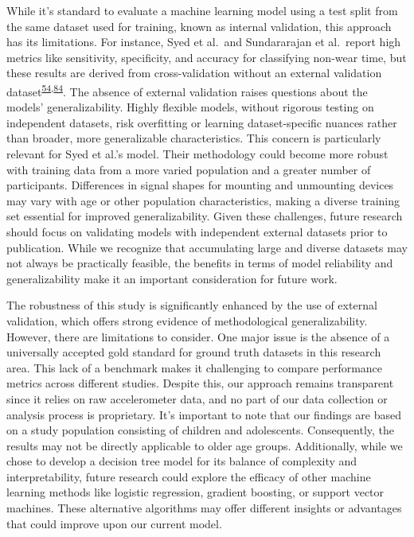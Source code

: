 \documentclass[
  9pt,
]{scrbook}
\begin{document}
While it's standard to evaluate a machine learning model using a test
split from the same dataset used for training, known as internal
validation, this approach has its limitations. For instance, Syed et
al.~and Sundararajan et al.~report high metrics like sensitivity,
specificity, and accuracy for classifying non-wear time, but these
results are derived from cross-validation without an external validation
dataset\textsuperscript{\protect\hyperlink{ref-sundararajan_sleep_2021}{54},\protect\hyperlink{ref-syed_evaluating_2020}{84}}.
The absence of external validation raises questions about the models'
generalizability. Highly flexible models, without rigorous testing on
independent datasets, risk overfitting or learning dataset-specific
nuances rather than broader, more generalizable characteristics. This
concern is particularly relevant for Syed et al.'s model. Their
methodology could become more robust with training data from a more
varied population and a greater number of participants. Differences in
signal shapes for mounting and unmounting devices may vary with age or
other population characteristics, making a diverse training set
essential for improved generalizability. Given these challenges, future
research should focus on validating models with independent external
datasets prior to publication. While we recognize that accumulating
large and diverse datasets may not always be practically feasible, the
benefits in terms of model reliability and generalizability make it an
important consideration for future work.

The robustness of this study is significantly enhanced by the use of
external validation, which offers strong evidence of methodological
generalizability. However, there are limitations to consider. One major
issue is the absence of a universally accepted gold standard for ground
truth datasets in this research area. This lack of a benchmark makes it
challenging to compare performance metrics across different studies.
Despite this, our approach remains transparent since it relies on raw
accelerometer data, and no part of our data collection or analysis
process is proprietary. It's important to note that our findings are
based on a study population consisting of children and adolescents.
Consequently, the results may not be directly applicable to older age
groups. Additionally, while we chose to develop a decision tree model
for its balance of complexity and interpretability, future research
could explore the efficacy of other machine learning methods like
logistic regression, gradient boosting, or support vector machines.
These alternative algorithms may offer different insights or advantages
that could improve upon our current model.
\end{document}
